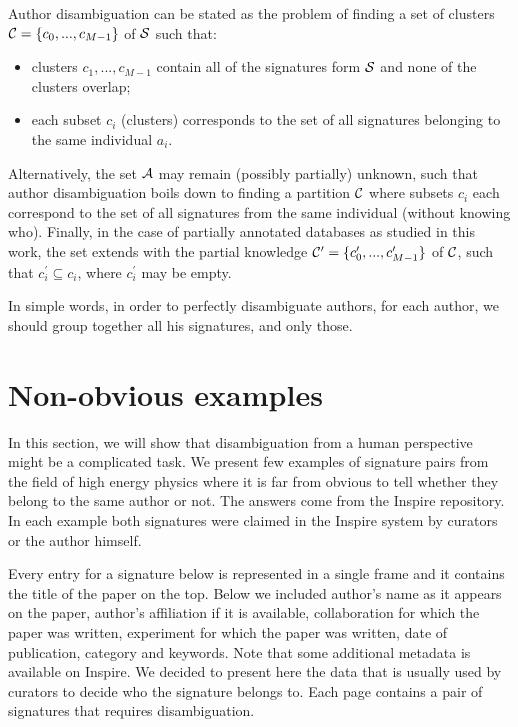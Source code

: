 \documentclass{pracamgr}
\begin{document}
Author disambiguation can be stated as the problem of finding a
set of clusters ${\cal C} = \{ c_0, ..., c_{M-1} \}$ of ${\cal S}$ such that:
\begin{itemize}
\item{clusters $c_{1}, ..., c_{M-1}$ contain all of the signatures form ${\cal S}$ and none of the clusters overlap;}
\item{each subset $c_i$ (clusters) corresponds to the set of all signatures belonging to the same
individual $a_i$.}
\end{itemize}
Alternatively, the set ${\cal A}$ may remain (possibly partially) 
unknown, such that author disambiguation boils down to finding a partition ${\cal C}$
where subsets $c_i$  each correspond to the set of all signatures from the same
individual (without knowing who). Finally, in the case of partially annotated databases
as studied in this work, the set extends with the partial knowledge ${\cal C}^\prime = \{
c_0^\prime, ..., c_{M-1}^\prime \}$ of ${\cal C}$, such that $c_i^\prime \subseteq c_i$,
where $c_i^\prime$ may be empty.

In simple words, in order to perfectly disambiguate authors, for each author, we should
group together all his signatures, and only those.

\section{Non-obvious examples}\label{sec:unobvious}
In this section, we will show that disambiguation from a human perspective might be
a complicated task. We present few examples of signature pairs from the field of high
energy physics where it is far from obvious to tell whether they belong to the same author or
not. The answers come from the Inspire repository. In each example both signatures were
claimed in the Inspire system by curators or the author himself.

Every entry for a signature below is represented in a single frame and it contains the title
of the paper on the top. Below we included author's name as it appears on the paper, author's 
affiliation if it is available, collaboration for which the paper was written, experiment for 
which the paper was written, date of publication, category and keywords. Note that some 
additional metadata is available on Inspire. We decided to present here the data that is 
usually used by curators to decide who the signature belongs to. Each page contains a pair of 
signatures that requires disambiguation.
\end{document}
